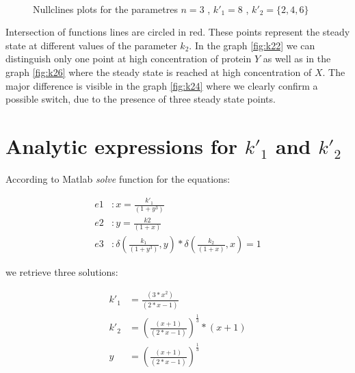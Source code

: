 \begin{figure}[h!]
  \centering
  ~
  ~
  \caption{Nullclines plots for the parametres $n = 3$ , $k'_1 = 8$ , $k'_2 =
  \{2,4,6\}$}
  \label{fig:nullclinesplots}
\end{figure}

Intersection of functions lines are circled in red. These points represent the
steady state at different values of the parameter $k_2$. In the graph
\ref{fig:k22} we can distinguish only one point at high concentration of protein
$Y$ as well as in the graph \ref{fig:k26} where the steady state is reached at
high concentration of $X$. The major difference is visible in the graph
\ref{fig:k24} where we clearly confirm a possible switch, due to the
presence of three steady state points.

\section{Analytic expressions for $k'_1$ and $k'_2$}

According to Matlab \emph{solve} function for the
equations:

\begin{subequations}
	\begin{align}
		e1 &: x = \frac{k'_1}{(1+y^3)}\\
		e2 &: y = \frac{k2}{(1+x)}\\
		e3 &: \delta(\frac{k_1}{(1+y^3)}, y)*\delta(\frac{k_2}{(1+x)},x) = 1
	\end{align}
\end{subequations}



we retrieve three solutions:

\begin{subequations}
	\begin{align}
		k'_1 &=\frac{(3*x^2)}{(2*x - 1)}\\ 
		k'_2 &=\left(\frac{(x + 1)}{(2*x - 1)}\right)^\frac{1}{3}*(x + 1)\\
		y &= \left(\frac{(x + 1)}{(2*x - 1)}\right)^\frac{1}{3}
	\end{align}
\end{subequations}

